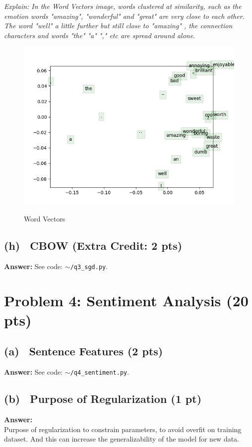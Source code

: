 \documentclass[fleqn]{MJD}
\newcommand{\problem}[1]{\chapter{Problem #1}}
\newcommand{\subproblem}[2]{\section{(#1)~ #2}}
\newcommand{\0}{\emptyset}
\begin{document}
\textit {Explain: In the Word Vectors image, words clustered at similarity, such as the emotion words "amazing", "wonderful" and "great" are very close to each other. The word "well" a little further but still close to "amazing"  , the connection characters and words "the" "a" "," etc are spread around alone.
}

\begin{figure}[!htbp]\centering
	\includegraphics[scale=1.0]{q3_word_vectors.png}
	\label{figure:wordvectors}
	\caption{Word Vectors}
\end{figure}


\subproblem{h}{CBOW (Extra Credit: 2 pts)}

\noindent \textbf{Answer:}  See code: $\sim$\verb|/q3_sgd.py|. \\




\newpage
\problem{4: Sentiment Analysis (20 pts)}

\subproblem{a}{Sentence Features (2 pts)}

\noindent \textbf{Answer:}  See code: $\sim$\verb|/q4_sentiment.py|.

\subproblem{b}{Purpose of Regularization (1 pt)}
\noindent \textbf{Answer:} \\

\noindent Purpose of regularization to constrain parameters, to avoid overfit on training dataset. And this can increase the generalizability of the model for new data.
\end{document}
